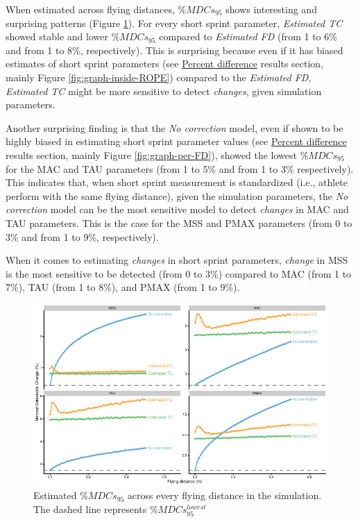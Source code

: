 \documentclass[fleqn,10pt]{wlpeerj} %
\begin{document}
When estimated across flying distances, \(\%MDCs_{95}\) shows interesting and surprising patterns (Figure \ref{fig:graph-MDC}). For every short sprint parameter, \emph{Estimated TC} showed stable and lower \(\%MDCs_{95}\) compared to \emph{Estimated FD} (from 1 to 6\% and from 1 to 8\%, respectively). This is surprising because even if it has biased estimates of short sprint parameters (see \protect\hyperlink{percent-difference}{Percent difference} results section, mainly Figure \ref{fig:graph-inside-ROPE}) compared to the \emph{Estimated FD}, \emph{Estimated TC} might be more sensitive to detect \emph{changes}, given simulation parameters.

Another surprising finding is that the \emph{No correction} model, even if shown to be highly biased in estimating short sprint parameter values (see \protect\hyperlink{percent-difference}{Percent difference} results section, mainly Figure \ref{fig:graph-per-FD}), showed the lowest \(\%MDCs_{95}\) for the MAC and TAU parameters (from 1 to 5\% and from 1 to 3\% respectively). This indicates that, when short sprint measurement is standardized (i.e., athlete perform with the same flying distance), given the simulation parameters, the \emph{No correction} model can be the most sensitive model to detect \emph{changes} in MAC and TAU parameters. This is the case for the MSS and PMAX parameters (from 0 to 3\% and from 1 to 9\%, respectively).

When it comes to estimating \emph{changes} in short sprint parameters, \emph{change} in MSS is the most sensitive to be detected (from 0 to 3\%) compared to MAC (from 1 to 7\%), TAU (from 1 to 8\%), and PMAX (from 1 to 9\%).



\begin{figure}

{\centering \includegraphics[width=0.9\linewidth]{shorts-simulation-paper_files/figure-latex/graph-MDC-1} 

}

\caption{Estimated \(\%MDCs_{95}\) across every flying distance in the simulation. The dashed line represents \(\%MDCs_{95}^{lowest}\)}\label{fig:graph-MDC}
\end{figure}
\end{document}
